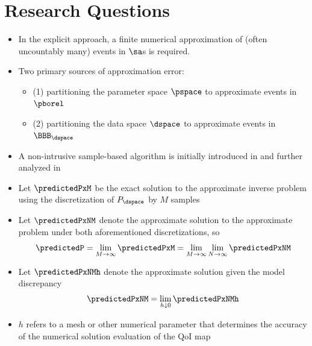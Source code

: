 
\section{Research Questions}
\begin{frame}[t]
\begin{itemize}
	\item In the explicit approach, a finite numerical approximation of (often uncountably many) events in $\sa$s is required.
	\item Two primary sources of approximation error: 
	\begin{itemize}[<+->]
	
		\item (1) partitioning the parameter space $\pspace$ to approximate events in $\pborel$
		\item (2) partitioning the data space $\dspace$ to approximate events in $\BBB_{\dspace}$
	
	\end{itemize}
	\item A non-intrusive sample-based algorithm is initially introduced in \cite{BET+14} and further analyzed in \cite{BET+14-arxiv}
\end{itemize}
\end{frame}


\begin{frame}[t]
\begin{itemize}
	\item <1-> Let $\predictedPxM$ be the exact solution to the approximate inverse problem using the discretization of $P_\dspace$ by $M$ samples
	\item <2-> Let $\predictedPxNM$ denote the approximate solution to the approximate problem under both aforementioned discretizations, so 
\[
\predictedP = \lim\limits_{M\to\infty} \predictedPxM = \lim\limits_{M\to\infty} \lim\limits_{N\to\infty} \predictedPxNM
\]
	\item <3-> Let $\predictedPxNMh$ denote the approximate solution given the model discrepancy
\[
\predictedPxNM= \lim\limits_{h \downarrow 0} \predictedPxNMh
\]
\item <3-> $h$ refers to a mesh or other numerical parameter that determines the accuracy of the numerical solution evaluation of the QoI map
\end{itemize}

\end{frame}

